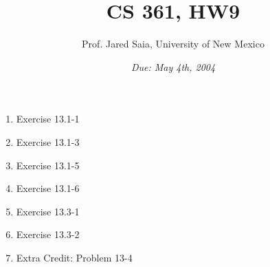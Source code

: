 \documentclass[11pt]{article}
\begin{document}
\title{CS 361, HW9}

\author {Prof. Jared Saia, University of New Mexico}

\date{\emph{Due: May 4th, 2004}}
\maketitle

\begin{enumerate}
\item Exercise 13.1-1
\item Exercise 13.1-3
\item Exercise 13.1-5
\item Exercise 13.1-6
\item Exercise 13.3-1
\item Exercise 13.3-2
\item Extra Credit: Problem 13-4
\end{enumerate}
\end{document}
